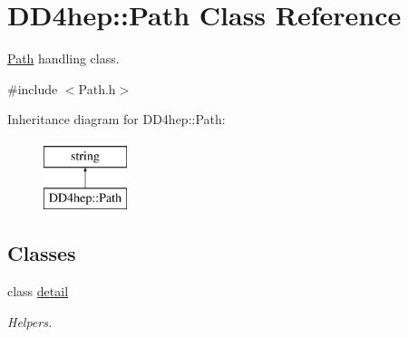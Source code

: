 \hypertarget{class_d_d4hep_1_1_path}{}\section{D\+D4hep\+:\+:Path Class Reference}
\label{class_d_d4hep_1_1_path}


\hyperlink{class_d_d4hep_1_1_path}{Path} handling class.  




{\ttfamily \#include $<$Path.\+h$>$}

Inheritance diagram for D\+D4hep\+:\+:Path\+:\begin{figure}[H]
\begin{center}
\leavevmode
\includegraphics[height=2.000000cm]{class_d_d4hep_1_1_path}
\end{center}
\end{figure}
\subsection*{Classes}
\begin{DoxyCompactItemize}
\item 
class \hyperlink{class_d_d4hep_1_1_path_1_1detail}{detail}
\begin{DoxyCompactList}\small\item\em Helpers. \end{DoxyCompactList}\end{DoxyCompactItemize}
